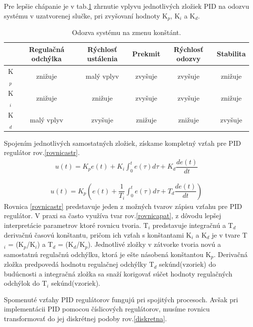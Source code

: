 Pre lepšie chápanie je v tab.\ref{PIDvplyv}\cite{pidcontrol} zhrnutie vplyvu jednotlivých zložiek PID na odozvu systému v uzatvorenej slučke, pri zvyšovaní hodnoty K$_p$, K$_i$ a K$_d$.

\begin{table}[!tbh]
	\begin{tabular}{|c|c|c|c|c|c|}
		\hline
		 & Regulačná odchýlka & Rýchlosť ustálenia & Prekmit & Rýchlosť odozvy & Stabilita \\ \hline
		K$_p$                    & znižuje            & malý vplyv         & zvyšuje      & zvyšuje         & znižuje           \\ \hline
		K$_i$                    & znižuje            & znižuje            & zvyšuje      & zvyšuje         & znižuje           \\ \hline
		K$_d$                    & malý vplyv         & zvyšuje            & znižuje      & znižuje         & zvyšuje           \\ \hline
	\end{tabular}
	\caption{Odozva systému na zmenu konštánt.}
	\label{PIDvplyv}
\end{table}

Spojením jednotlivých samostatných zložiek, získame kompletný vzťah pre PID regulátor rov.\ref{rovnicastr}.
\begin{align}
	\label{rovnicastr}
	u(t)=K_p e(t) + K_i  \int_{0}^{t} e(\tau)d\tau + K_d  \dfrac{de(t)}{dt}
\end{align}

\begin{align}
	\label{rovnicapat}
	u(t)=K_p \left(e(t) + \dfrac{1}{T_i}  \int_{0}^{t} e(\tau)d\tau + T_d  \dfrac{de(t)}{dt}\right)
\end{align}
Rovnica \ref{rovnicastr} predstavuje jeden z možných tvarov zápisu vzťahu pre PID regulátor. V praxi sa často využíva tvar rov.\ref{rovnicapat}, z dôvodu lepšej interpretácie parametrov ktoré rovnicu tvoria. T$_i$ predstavuje integračnú a T$_d$ derivačnú časovú konštantu, pričom ich vzťah s konštantami K$_i$ a K$_d$ je v tvare T$_i$ = (K$_p$/K$_i$) a T$_d$ = (K$_d$/K$_p$). Jednotlivé zložky v zátvorke tvoria novú a samostatnú regulačnú odchýlku, ktorá je ešte násobená konštantou K$_p$. Derivačná zložka predpovedá hodnotu regulačnej odchýlky T$_d$ sekúnd(vzoriek) do budúcnosti a integračná zložka sa snaží korigovať súčet hodnoty regulačných odchýlok do T$_i$ sekúnd(vzoriek)\cite{pidcontrol}.

Spomenuté vzťahy PID regulátorov fungujú pri spojitých procesoch. Avšak pri implementácii PID pomocou číslicových regulátorov, musíme rovnicu transformovať do jej diskrétnej podoby rov.\ref{diskretna}.

